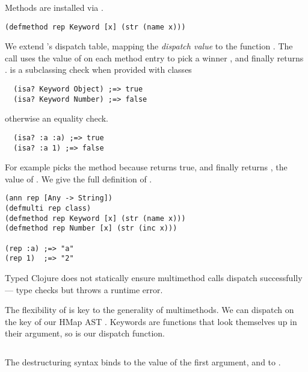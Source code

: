 Methods are installed via {}.
\begin{verbatim}
(defmethod rep Keyword [x] (str (name x)))
\end{verbatim}
We extend 's dispatch table, mapping
the \emph{dispatch value}  to the function
. The call 
uses the value of 
on each method entry to pick a winner , and finally returns .
 is a subclassing check when provided with classes
\begin{verbatim}
  (isa? Keyword Object) ;=> true
  (isa? Keyword Number) ;=> false
\end{verbatim}
otherwise an equality check.
\begin{verbatim}
  (isa? :a :a) ;=> true
  (isa? :a 1) ;=> false
\end{verbatim}

For example
picks the  method because
 returns true,
and finally returns , the value of
.
We give the full definition of .

\begin{Code}
\begin{exmp}
\begin{verbatim}
(ann rep [Any -> String])
(defmulti rep class)
(defmethod rep Keyword [x] (str (name x)))
(defmethod rep Number [x] (str (inc x)))

(rep :a) ;=> "a"
(rep 1)  ;=> "2"
\end{verbatim}
\end{exmp}
\end{Code}
Typed Clojure does not statically ensure multimethod calls dispatch successfully---
 type checks but throws a runtime error.

The flexibility of  is key to the generality of multimethods. 
We can dispatch on the  key 
of our HMap AST .
Keywords are functions that look themselves up in their argument, so 
is our dispatch function.
\begin{Code}
\begin{exmp}
\inputminted[firstline=4,lastline=23]{clojure}{code/demo/src/demo/eg5.clj}
\end{exmp}
\end{Code}
The destructuring syntax  binds
 to the value of the first argument, and  to .

